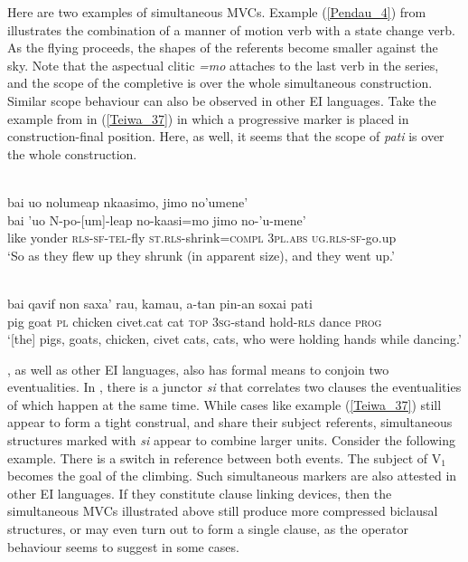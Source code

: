 Here are two examples of simultaneous MVCs. Example (\ref{Pendau_4}) from  illustrates the combination of a manner of motion verb with a state change verb. As the flying proceeds, the shapes of the referents become smaller against the sky. Note that the aspectual clitic \textit{=mo} attaches to the last verb in the series, and the scope of the completive is over the whole simultaneous construction. Similar scope behaviour can also be observed in other EI languages. Take the example from  in (\ref{Teiwa_37}) in which a progressive marker is placed in construction-final position. Here, as well, it seems that the scope of \textit{pati} is over the whole construction. 

\ea \label{Pendau_4}
\\
\glll bai uo nolumeap nkaasimo, jimo no'umene' \\
bai 'uo N-po-[um]-leap no-kaasi=mo jimo no-'u-mene' \\
like yonder \textsc{rls}-\textsc{sf}-\textsc{tel}-fly \textsc{st}.\textsc{rls}-shrink=\textsc{compl} 3\textsc{pl}.\textsc{abs} \textsc{ug}.\textsc{rls}-\textsc{sf}-go.up \\
\glft `So as they flew up they shrunk (in apparent size), and they went up.'\\ 
\z

\ea \label{Teiwa_37}
\\
\gll bai qavif non saxa' rau, kamau, a-tan pin-an soxai pati \\
pig goat \textsc{pl} chicken civet.cat cat \textsc{top} 3\textsc{sg}-stand hold-\textsc{rls} dance \textsc{prog} \\
\glft `[the] pigs, goats, chicken, civet cats, cats, who were holding hands while dancing.'\\ 
\z

, as well as other EI languages, also has formal means to conjoin two eventualities. In , there is a junctor \textit{si} that correlates two clauses the eventualities of which happen at the same time. While cases like example (\ref{Teiwa_37}) still appear to form a tight construal, and share their subject referents, simultaneous structures marked with \textit{si} appear to combine larger units. Consider the following example. There is a switch in reference between both events. The subject of V$_1$ becomes the goal of the climbing. Such simultaneous markers are also attested in other EI languages. If they constitute clause linking devices, then the simultaneous MVCs illustrated above still produce more compressed biclausal structures, or may even turn out to form a single clause, as the operator behaviour seems to suggest in some cases.

